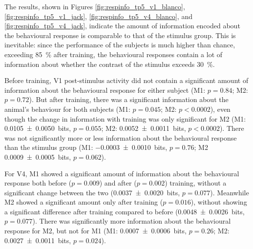 

The results, shown in Figures \ref{fig:respinfo_tp5_v1_blanco}, \ref{fig:respinfo_tp5_v1_jack}, \ref{fig:respinfo_tp5_v4_blanco}, and \ref{fig:respinfo_tp5_v4_jack}, indicate the amount of information encoded about the behavioural response is comparable to that of the stimulus group.
This is inevitable: since the performance of the subjects is much higher than chance, exceeding \SI{85}{\percent} after training, the behavioural responses contain a lot of information about whether the contrast of the stimulus exceeds \SI{30}{\percent}.


Before training, \ac{V1} post-stimulus activity did not contain a significant amount of information about the behavioural response for either subject (\ac{M1}: $p=0.84$; \ac{M2}: $p=0.72$).
But after training, there was a significant information about the animal's behaviour for both subjects (\ac{M1}: $p=0.045$; \ac{M2}: $p < 0.0002$), even though the change in information with training was only significant for \ac{M2} (\ac{M1}: \SI{+0.0105\pm0.0050}{bits}, $p=0.055$; \ac{M2}: \SI{+0.0052\pm0.0011}{bits}, $p < 0.0002$).
There was not significantly more or less information about the behavioural response than the stimulus group (\ac{M1}: \SI{-0.0003\pm0.0010}{bits}, $p=0.76$; \ac{M2} \SI{+0.0009\pm0.0005}{bits}, $p=0.062$).

For \ac{V4}, \ac{M1} showed a significant amount of information about the behavioural response both before ($p=0.009$) and after ($p=0.002$) training, without a significant change between the two (\SI{+0.0037\pm0.0020}{bits}, $p=0.077$).
Meanwhile \ac{M2} showed a significant amount only after training ($p=0.016$), without showing a significant difference after training compared to before (\SI{+0.0048\pm0.0026}{bits}, $p=0.077$).
There was significantly more information about the behavioural response for \ac{M2}, but not for \ac{M1} (\ac{M1}: \SI{+0.0007\pm0.0006}{bits}, $p=0.26$; \ac{M2}: \SI{+0.0027\pm0.0011}{bits}, $p=0.024$).

